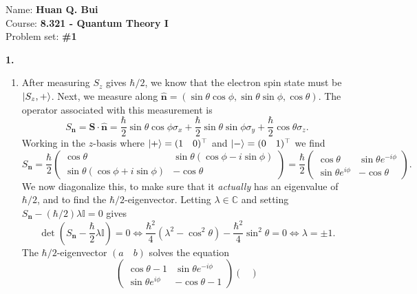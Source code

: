 \documentclass{article}
\theoremstyle{definition}
\newcommand{\f}[2]{\frac{#1}{#2}}
\newcommand{\lp}{\left(}
\newcommand{\rp}{\right)}
\begin{document}
\begin{framed}
\noindent Name: \textbf{Huan Q. Bui}\\
Course: \textbf{8.321 - Quantum Theory I}\\
Problem set: \textbf{\#1}
\end{framed}
	
	
\noindent \textbf{1.} 
\begin{enumerate}[label=(\alph*)]
	\item After measuring $S_z$ gives $\hbar/2$, we know that the electron spin state must be $\ket{S_z, +}$. Next, we measure along $\widehat{\mathbf{n}} = (\sin\theta \cos\phi, \sin\theta\sin\phi, \cos\theta)$. The operator associated with this measurement is 
	\begin{equation*}
	{S}_\mathbf{n} = \mathbf{S}\cdot \widehat{\mathbf{n}} = \f{\hbar}{2}\sin\theta\cos\phi \sigma_x + \f{\hbar}{2}\sin\theta\sin\phi \sigma_y + \f{\hbar}{2}\cos\theta\sigma_z. 
	\end{equation*}
	Working in the $z$-basis where $\ket{+} = (1\quad0)^\top$ and $\ket{-} = (0\quad 1)^\top$ we find 
	\begin{equation*}
	{S}_\mathbf{n} = 
	\f{\hbar}{2}\begin{pmatrix}
	\cos\theta & \sin\theta (\cos\phi - i \sin\phi) \\
	\sin\theta (\cos\phi + i \sin\phi) & -\cos\theta
	\end{pmatrix}
	= \f{\hbar}{2}\begin{pmatrix}
	\cos\theta & \sin\theta e^{-i\phi} \\
	\sin\theta e^{i\phi} & -\cos\theta
	\end{pmatrix}.
	\end{equation*}
	We now diagonalize this, to make sure that it \textit{actually} has an eigenvalue of $\hbar/2$, and to find the $\hbar/2$-eigenvector. Letting $\lambda \in \mathbb{C}$ and setting $S_\mathbf{n} - (\hbar/2)\lambda \mathbb{I} = 0$ gives 
	\begin{equation*}
	\det\lp S_\mathbf{n} - \f{\hbar}{2}\lambda \mathbb{I}\rp = 0 \iff 
	\f{\hbar^2}{4}\lp \lambda^2 - \cos^2\theta \rp - \f{\hbar^2}{4}\sin^2\theta = 0 \iff \lambda = \pm 1.
	\end{equation*} 
	The $\hbar/2$-eigenvector $(a \quad b)$ solves the equation
	\begin{equation*}
	\begin{pmatrix}
	\cos\theta - 1 & \sin\theta e^{-i\phi} \\
	\sin\theta e^{i\phi} & -\cos\theta - 1
	\end{pmatrix}\begin{pmatrix}

\end{pmatrix}
\end{equation*}
\end{enumerate}
\end{document}
